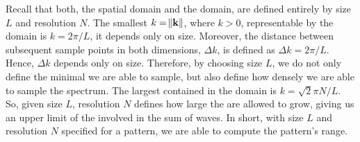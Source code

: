Recall that both, the spatial domain and the \wavevector domain, are defined
entirely by size $L$ and resolution $N$. The smallest \wavenumber
$k = \norm{\mathbf{k}}$, where $k > 0$, representable by the \wavevector domain is
$k = 2\pi/L$, it depends only on size. Moreover, the distance between subsequent
sample points in both dimensions, $\Delta k$, is defined as $\Delta k = 2\pi/L$.
Hence, $\Delta k$ depends only on size. Therefore, by choosing size $L$, we do
not only define the minimal \wavenumber we are able to sample, but also define
how densely we are able to sample the spectrum. The largest \wavenumber contained
in the \wavevector domain is $k = \sqrt{2}\pi N/L$. So, given size $L$,
resolution $N$ defines how large the \wavenumbers are allowed to grow, giving us
an upper limit of the \wavenumbers involved in the sum of waves. In short, with
size $L$ and resolution $N$ specified for a pattern, we are able to compute the
pattern's \wavenumber range.
%
